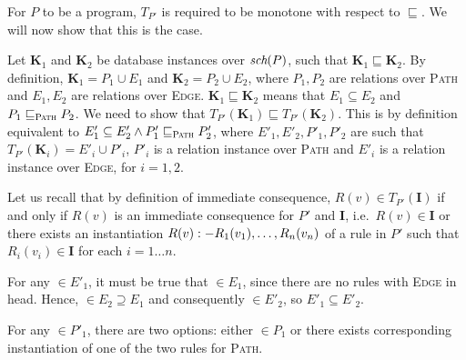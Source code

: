 \begin{exmp}
For $P$ to be a \datalogra program, $T_{P'}$ is required to be monotone with respect to $\sqsubseteq$. We will now show that this is the case.

Let \textbf{K}$_1$ and \textbf{K}$_2$ be database instances over $\textit{sch}(P)$, such that $\textbf{K}_1 \sqsubseteq \textbf{K}_2$. By definition, $\textbf{K}_1 = P_1 \cup E_1$ and $\textbf{K}_2 = P_2 \cup E_2$, where $P_1, P_2$ are relations over \textsc{Path} and $E_1, E_2$ are relations over \textsc{Edge}.  $\textbf{K}_1 \sqsubseteq \textbf{K}_2$ means that $E_1 \subseteq E_2$ and $P_1 \sqsubseteq_\textsc{Path} P_2$. We need to show that $T_{P'}(\textbf{K}_1) \sqsubseteq T_{P'}(\textbf{K}_2)$. This is by definition equivalent to $E'_1 \subseteq E'_2 \wedge P'_1 \sqsubseteq_\textsc{Path} P'_2$, where $E'_1, E'_2, P'_1, P'_2$ are such that $T_{P'}(\textbf{K}_i) = E'_i \cup P'_i$, $P'_i$ is a relation instance over \textsc{Path} and $E'_i$ is a relation instance over \textsc{Edge}, for $i = 1, 2$.

Let us recall that by definition of immediate consequence, $R(v) \in T_{P'}(\textbf{I})$ if and only if $R(v)$ is an immediate consequence for $P'$ and \textbf{I}, i.e.\ $R(v) \in \textbf{I}$ or there exists an instantiation $R(v) :- R_1(v_1), \dots, R_n(v_n)$ of a rule in $P'$ such that $R_i(v_i) \in \textbf{I}$ for each $i = 1\dots n$.

For any $ \in E'_1$, it must be true that $ \in E_1$, since there are no rules with \textsc{Edge} in head. Hence, $ \in E_2 \supseteq E_1$ and consequently $ \in E'_2$, so $E'_1 \subseteq E'_2$.

For any $ \in P'_1$, there are two options: either $ \in P_1$ or there exists corresponding instantiation of one of the two rules for \textsc{Path}.








\end{exmp}

